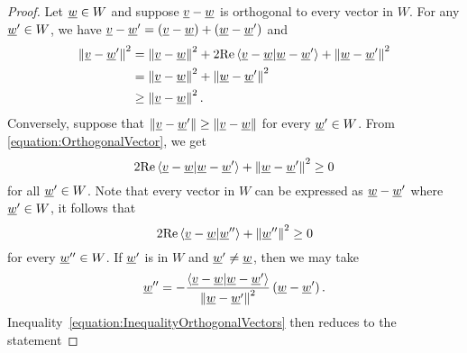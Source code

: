 \begin{proof}
Let $\underline{w} \in W$ and suppose $\underline{v} - \underline{w}$ is orthogonal to every vector in $W$.
For any $\underline{w}' \in W$, we have $\underline{v} - \underline{w}' = \left( \underline{v} - \underline{w} \right) + \left( \underline{w} - \underline{w}' \right)$ and
\begin{equation} \label{equation:OrthogonalVector}
\begin{split}
\left\| \underline{v} - \underline{w}' \right\|^2
&= \left\| \underline{v} - \underline{w} \right\|^2
+ 2 \mathrm{Re} \left\langle \underline{v} - \underline{w} | \underline{w} - \underline{w}' \right\rangle
+ \left\| \underline{w} - \underline{w}' \right\|^2 \\
&= \left\| \underline{v} - \underline{w} \right\|^2
+ \left\| \underline{w} - \underline{w}' \right\|^2 \\
&\geq \left\| \underline{v} - \underline{w} \right\|^2.
\end{split}
\end{equation}
Conversely, suppose that $\left\| \underline{v} - \underline{w}' \right\| \geq \left\| \underline{v} - \underline{w} \right\|$ for every $\underline{w}' \in W$.
From \eqref{equation:OrthogonalVector}, we get
\begin{equation*}
2 \mathrm{Re} \left\langle \underline{v} - \underline{w} | \underline{w} - \underline{w}' \right\rangle
+ \left\| \underline{w} - \underline{w}' \right\|^2 \geq 0
\end{equation*}
for all $\underline{w}' \in W$.
Note that every vector in $W$ can be expressed as $\underline{w} - \underline{w}'$ where $\underline{w}' \in W$, it follows that
\begin{equation} \label{equation:InequalityOrthogonalVectors}
2 \mathrm{Re} \left\langle \underline{v} - \underline{w} | \underline{w}'' \right\rangle
+ \left\| \underline{w}'' \right\|^2 \geq 0
\end{equation}
for every $\underline{w}'' \in W$.
If $\underline{w}'$ is in $W$ and $\underline{w}' \neq \underline{w}$, then we may take
\begin{equation*}
\underline{w}'' = - \frac{ \left\langle \underline{v} - \underline{w} | \underline{w} - \underline{w}' \right\rangle }{ \left\| \underline{w} - \underline{w}' \right\|^2 } \left( \underline{w} - \underline{w}' \right).
\end{equation*}
Inequality~\eqref{equation:InequalityOrthogonalVectors} then reduces to the statement

\end{proof}
